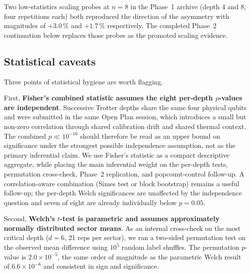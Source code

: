 \documentclass[reprint,aps,physrev,superscriptaddress,floatfix,longbibliography]{revtex4-2}
\begin{document}
Two low-statistics scaling probes at $n = 8$ in the Phase~1 archive
(depth 4 and 8, four repetitions each) both reproduced the direction
of the asymmetry with magnitudes of $+3.0\,\%$ and $+1.7\,\%$
respectively. The completed Phase~2 continuation below replaces those
probes as the promoted scaling evidence.

\subsection{Statistical caveats}

Three points of statistical hygiene are worth flagging.

First, \textbf{Fisher's combined statistic assumes the eight per-depth
$p$-values are independent}. Successive Trotter depths share the same
four physical qubits and were submitted in the same Open Plan
session, which introduces a small but non-zero correlation through
shared calibration drift and shared thermal context. The combined
$p \ll 10^{-16}$ should therefore be read as an upper bound on
significance under the strongest possible independence assumption, not
as the primary inferential claim.
We use Fisher's statistic as a compact descriptive aggregate, while
placing the main inferential weight on the per-depth tests,
permutation cross-check, Phase~2 replication, and popcount-control
follow-up. A correlation-aware combination (Simes test or block
bootstrap) remains a useful follow-up; the per-depth Welch
significances are unaffected by the independence question and seven
of eight are already individually below $p = 0.05$.

Second, \textbf{Welch's $t$-test is parametric and assumes
approximately normally distributed sector means}. As an internal
cross-check on the most critical depth ($d = 6$, 21 reps per sector),
we ran a two-sided permutation test on the observed mean difference
using $10^{5}$ random label shuffles. The permutation $p$-value is
$2.0 \times 10^{-5}$, the same order of magnitude as the parametric
Welch result of $6.6 \times 10^{-6}$ and consistent in sign and
significance.
\end{document}

